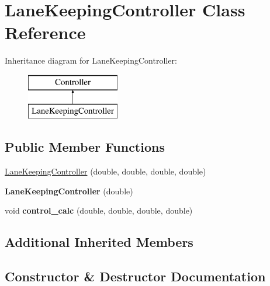 \hypertarget{class_lane_keeping_controller}{}\section{Lane\+Keeping\+Controller Class Reference}
\label{class_lane_keeping_controller}
Inheritance diagram for Lane\+Keeping\+Controller\+:\begin{figure}[H]
\begin{center}
\leavevmode
\includegraphics[height=2.000000cm]{class_lane_keeping_controller}
\end{center}
\end{figure}
\subsection*{Public Member Functions}
\begin{DoxyCompactItemize}
\item 
\mbox{\hyperlink{class_lane_keeping_controller_abd629cf69685b7db2111cbde718c191b}{Lane\+Keeping\+Controller}} (double, double, double, double)
\item 
\mbox{\label{class_lane_keeping_controller_a00fac704d4f28d20cb70c40b783e3085}} 
{\bfseries Lane\+Keeping\+Controller} (double)
\item 
\mbox{\label{class_lane_keeping_controller_a931f2cd19c96367443cb66b47ba62441}} 
void {\bfseries control\+\_\+calc} (double, double, double, double)
\end{DoxyCompactItemize}
\subsection*{Additional Inherited Members}


\subsection{Constructor \& Destructor Documentation}
\mbox{\label{class_lane_keeping_controller_abd629cf69685b7db2111cbde718c191b}} 
